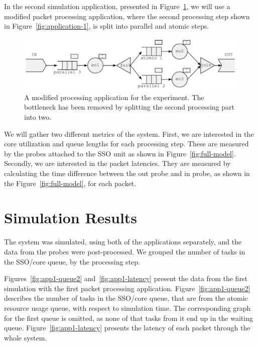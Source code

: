 In the second simulation application, presented in Figure~\ref{fig:application-2}, we will use a modified packet processing application, where the second processing step shown in Figure~\ref{fig:application-1}, is split into parallel and atomic steps.

\begin{figure}[]
  \begin{center}
    \includegraphics[width=\textwidth]{images/application-2.pdf}
    \caption{A modified processing application for the experiment. The bottleneck has been removed by splitting the second processing part into two.}
    \label{fig:application-2}
  \end{center}
\end{figure}

We will gather two different metrics of the system. First, we are interested in the core utilization and queue lengths for each processing step. These are measured by the probes attached to the SSO unit as shown in Figure~\ref{fig:full-model}. Secondly, we are interested in the packet latencies. They are measured by calculating the time difference between the out probe and in probe, as shown in the Figure~\ref{fig:full-model}, for each packet.

\section{Simulation Results}
\label{sec:simulation-results}

The system was simulated, using both of the applications separately, and the data from the probes were post-processed. We grouped the number of tasks in the SSO/core queue, by the processing step.

Figures~\ref{fig:app1-queue2} and~\ref{fig:app1-latency} present the data from the first simulation with the first packet processing application. Figure~\ref{fig:app1-queue2} describes the number of tasks in the SSO/core queue, that are from the atomic resource usage queue, with respect to simulation time. The corresponding graph for the first queue is omitted, as none of that tasks from it end up in the waiting queue. Figure~\ref{fig:app1-latency} presents the latency of each packet through the whole system.

